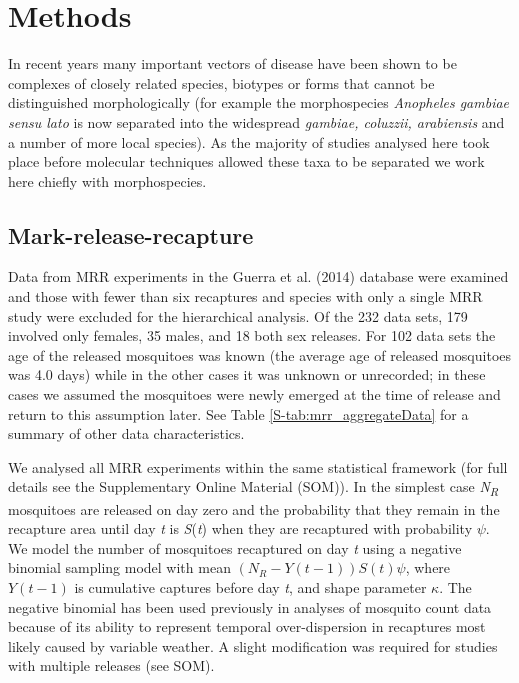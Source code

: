 \documentclass[]{article}
\begin{document}
\section{Methods}\label{methods}

In recent years many important vectors of disease have been shown to be
complexes of closely related species, biotypes or forms that cannot
be distinguished morphologically (for example the morphospecies
\emph{Anopheles gambiae sensu lato} is now separated into the widespread
\emph{gambiae, coluzzii, arabiensis} and a number of more local
species). As the majority of studies analysed here took place before
molecular techniques allowed these taxa to be separated we work here
chiefly with morphospecies.

\subsection{Mark-release-recapture}\label{mark-release-recapture}

Data from MRR experiments in the Guerra et al. (2014) database were
examined and those with fewer than six recaptures and species with only
a single MRR study were excluded for the hierarchical analysis. Of the
232 data sets, 179 involved only females, 35 males, and 18 both sex
releases. For 102 data sets the age of the released mosquitoes was known
(the average age of released mosquitoes was 4.0 days) while in the other
cases it was unknown or unrecorded; in these cases we assumed the
mosquitoes were newly emerged at the time of release and return to this
assumption later. See Table \ref{S-tab:mrr_aggregateData} for a summary of other data characteristics.

We analysed all MRR experiments within the same statistical framework
(for full details see the Supplementary Online Material (SOM)). In the
simplest case \emph{N\textsubscript{R}} mosquitoes are released on day
zero and the probability that they remain in the recapture area until
day \emph{t} is \emph{S}(\emph{t}) when they are recaptured with
probability $\psi$. We model the number of mosquitoes recaptured on
day \emph{t} using a negative binomial sampling model with mean
\(\left( N_{R} - Y\left( t - 1 \right) \right)S\left( t \right)\psi\),
where \(Y\left( t - 1 \right)\) is cumulative captures before day
\emph{t}, and shape parameter $\kappa$. The negative binomial has been
used previously in analyses of mosquito count data \citep{service1971studies,nedelman1983negative} because of its ability to
represent temporal over-dispersion in recaptures most likely caused by
variable weather. A slight modification was required for studies with
multiple releases (see SOM).
\end{document}
